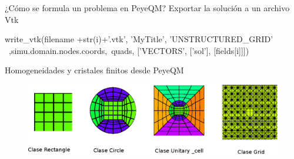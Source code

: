 \documentclass[xcolor=table,serif]{beamer}
\begin{document}
	\begin{frame}[fragile]{¿Cómo se formula un problema en PeyeQM?}
	Exportar la solución a un archivo Vtk
	\begin{python}
	write_vtk(filename +str(i)+'.vtk', 'MyTitle', 'UNSTRUCTURED_GRID' \
	 ,simu.domain.nodes.coords,\	 				
        quads, ['VECTORS', ['sol'], [fields[i]]])
\end{python}
	\end{frame}
	\begin{frame}[fragile]{Homogeneidades y cristales finitos desde PeyeQM}
		\begin{figure}
		\centering
		\includegraphics[scale=0.7]{gmsh_library_classes.eps}
		\end{figure}
	\end{frame}
\end{document}
